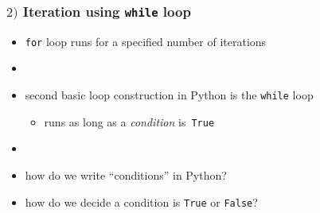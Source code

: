 \documentclass[english,14pt]{beamer}
\newcommand\red[1]{{\color{red} #1}}
\begin{document}
\begin{frame}[fragile]

\frametitle{$2)$ Iteration using \texttt{while} loop}

\begin{itemize}
	\item \texttt{for} loop runs for a specified number of iterations

	\item[]
	
	\item second basic loop construction in Python is the \texttt{while} loop
	\begin{itemize}
		\item runs as long as a \red{\emph{condition}} is~\texttt{True}
	\end{itemize}
	
	\item[]
	
	\item how do we write ``conditions'' in Python?
	
	
	\item how do we decide a condition is \texttt{True} or \texttt{False}?
\end{itemize}

\end{frame}

\end{document}
